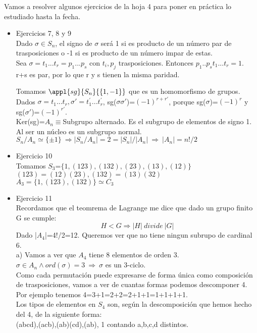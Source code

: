 \documentclass[nochap]{apuntes}
\begin{document}
Vamos a resolver algunos ejercicios de la hoja 4 para poner en práctica lo estudiado hasta la fecha.
\begin{itemize}
 \item Ejercicios 7, 8 y 9\\
 Dado $\sigma \in S_n$, el signo de $\sigma$  será 1 si es producto de un número par de trasposiciones o -1 si es producto de un número
 impar de estas.\\
 Sea $\sigma = t_1...t_r=p_1...p_s$  con $t_i, p_j$  trasposiciones. Entonces $p_1..p_s t_1...t_r=1$.\\
 r+s es par, por lo que r y s tienen la misma paridad.

 Tomamos $\appl{sg}{S_n}{\{1,-1\}}$  que es un homomorfismo de grupos.\\
 Dados $\sigma=t_1...t_r,  \sigma'=t_1^{'}...t_r^{'}$, sg($\sigma \sigma'$)=$(-1)^{r+r'}$, porque sg($\sigma$)=$(-1)^r$  y sg($\sigma'$)=$(-1)^{r'}$.\\
 Ker(sg)=$A_n \equiv$Subgrupo alternado. Es el subgrupo de elementos de signo 1. Al ser un núcleo es un subgrupo normal.\\
 $S_n/A_n\simeq \{\pm 1\} \ \Rightarrow |S_n/A_n|=2=|S_n|/|A_n| \ \Rightarrow \ |A_n|=n!/2$\\

 \item Ejercicio 10\\
 Tomamos $S_3$=$\{1, (123), (132), (23), (13), (12)\}$\\
 $(123)=(12)(23), (132)=(13)(32)$\\
 $A_3=\{1, (123), (132)\} \simeq C_3$

 \item Ejercicio 11\\
 Recordamos que el teomrema de Lagrange me dice que dado un grupo finito G se cumple:
 \[H<G \Rightarrow |H| \ divide\ |G|\]
 Dado |$A_4$|=4!/2=12. Queremos ver que no tiene ningun subrupo de cardinal 6.\\

 a) Vamos a ver que $A_4$  tiene 8 elementos de orden 3.\\
 $\sigma\in A_n \wedge ord(\sigma)=3 \ \Rightarrow \ \sigma$  es un 3-ciclo.\\
 Como cada permutación puede expresarse de forma única como composición de trasposiciones, vamos a ver de cuantas formas podemos
 descomponer 4. Por ejemplo tenemos 4=3+1=2+2=2+1+1=1+1+1+1.\\
 Los tipos de elementos en $S_4$  son, según la descomposición que hemos hecho del 4, de la siguiente forma:\\
 (abcd),(acb),(ab)(cd),(ab), 1 contando a,b,c,d distintos.\\


\end{itemize}
\end{document}
